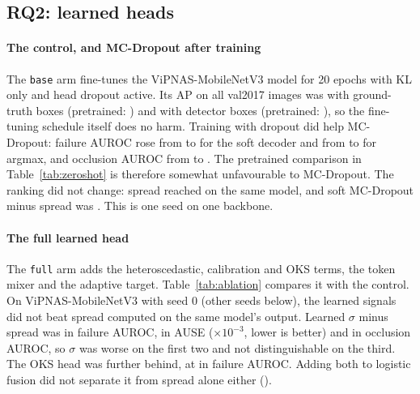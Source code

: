 \documentclass[preprint,11pt]{elsarticle}
\begin{document}
\begin{table}[t]
\centering\small
\caption{Split-conformal regions at 90\% target coverage. Radii are in normalised error units.}
\label{tab:conformal}
\end{table}

\subsection{RQ2: learned heads}

\paragraph{The control, and MC-Dropout after training} The \texttt{base} arm fine-tunes the
ViPNAS-MobileNetV3 model for 20 epochs with KL only and head dropout active. Its AP on all val2017
images was \ApGtFtMbvThreeBaseSZero{} with ground-truth boxes (pretrained: \ApGtZsSimccMbvThree{}) and
\ApDetFtMbvThreeBaseSZero{} with detector boxes (pretrained: \ApDetZsSimccMbvThree{}), so the
fine-tuning schedule itself does no harm. Training with dropout did help MC-Dropout: failure AUROC rose
from \FaZsSimccMbvThreeMcSoft{} to \FaFtMbvThreeBaseSZeroMcSoft{} for the soft decoder and from
\FaZsSimccMbvThreeMc{} to \FaFtMbvThreeBaseSZeroMc{} for argmax, and occlusion AUROC from
\OaZsSimccMbvThreeMcSoft{} to \OaFtMbvThreeBaseSZeroMcSoft{}. The pretrained comparison in
Table~\ref{tab:zeroshot} is therefore somewhat unfavourable to MC-Dropout. The ranking did not change:
spread reached \FaFtMbvThreeBaseSZeroDist{} on the same model, and soft MC-Dropout minus spread was
\DfaFtMbvThreeBaseSZeroMcSoftMinusDist{}. This is one seed on one backbone.

\paragraph{The full learned head} The \texttt{full} arm adds the heteroscedastic, calibration and OKS
terms, the token mixer and the adaptive target. Table~\ref{tab:ablation} compares it with the control.
On ViPNAS-MobileNetV3 with seed 0 (other seeds below), the learned signals did not beat spread computed
on the same model's output. Learned $\sigma$ minus spread was \DfaFtMbvThreeFullSZeroHetMinusDist{} in failure
AUROC, \DauseFtMbvThreeFullSZeroHetMinusDist{} in AUSE ($\times 10^{-3}$, lower is better) and
\DoaFtMbvThreeFullSZeroHetMinusDist{} in occlusion AUROC, so $\sigma$ was worse on the first two and
not distinguishable on the third. The OKS head was further behind, at
\DfaFtMbvThreeFullSZeroOksMinusDist{} in failure AUROC. Adding both to logistic fusion did not separate
it from spread alone either (\DfaFtMbvThreeFullSZeroFusionMinusDist{}).
\end{document}
